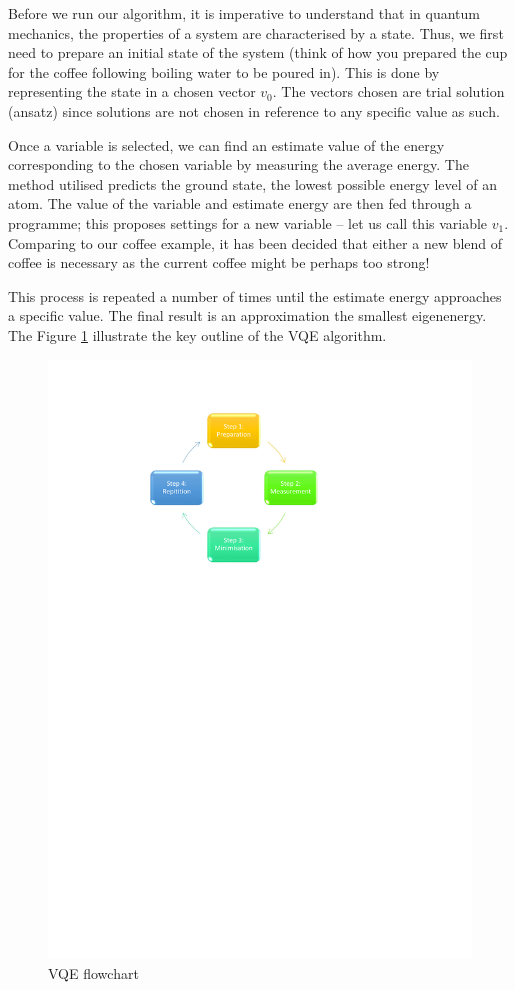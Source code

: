 \documentclass[12pt]{article}
\begin{document}
Before we run our algorithm, it is imperative to understand that in quantum mechanics, the properties of a system are characterised by a state.
Thus, we first need to prepare an initial state of the system (think of how you prepared the cup for the coffee following boiling water to be
poured in). This is done by representing the state in a chosen vector $v_0$. The vectors chosen are trial solution (ansatz) since solutions are
 not chosen in reference to any specific value as such.

Once a variable is selected, we can find an estimate value of the energy corresponding to the chosen variable by measuring the average energy.
The method utilised predicts the ground state, the lowest possible energy level of an atom. The value of the variable and estimate energy are
then fed through a programme; this proposes settings for a new variable – let us call this variable $v_1$­. Comparing to our coffee example, it
 has been decided that either a new blend of coffee is necessary as the current coffee might be perhaps too strong!

This process is repeated a number of times until the estimate energy approaches a specific value. The final result is an approximation the smallest eigenenergy. The Figure \ref{VQE} illustrate the key outline of the VQE algorithm.
\begin{figure}[H]
\begin{center}
\includegraphics[scale=0.75]{VQEdiagram.pdf}
\end{center}
\caption{VQE flowchart}\label{VQE}
\end{figure}
\end{document}
